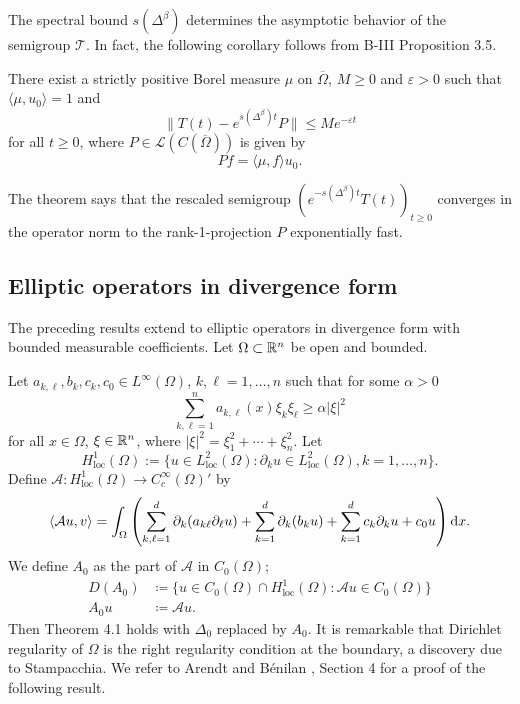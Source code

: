 The spectral bound $s(\Delta^\beta)$ determines the asymptotic behavior of the semigroup $\mathcal{T}$. 
In fact, the following corollary follows from B-III Proposition 3.5.
\begin{corollary} 
There exist a strictly positive Borel measure $\mu$ on $\overline{\Omega}$, $M \geq 0$ and $\varepsilon > 0$ such that $\langle \mu, u_0 \rangle = 1$ and
\[\|T(t) - e^{s(\Delta^\beta)t}P\| \leq Me^{-\varepsilon t}\]
for all $t \geq 0$, where $P \in \mathcal{L}(C(\overline{\Omega}))$ is given by
\[Pf = \langle \mu, f \rangle u_0.\]
\end{corollary}
The theorem says that the rescaled semigroup $(e^{-s(\Delta^\beta)t}T(t))_{t \geq 0}$ converges in the operator norm to the rank-1-projection $P$ exponentially fast.
\subsection{Elliptic operators in divergence form}
The preceding results extend to elliptic operators in divergence form with bounded measurable coefficients. Let $\Omega \subset \mathbb{R}^n$ be open and bounded.

Let $a_{k,\ell}, b_k, c_k, c_0 \in L^\infty(\Omega)$, $k, \ell = 1, \ldots, n$ such that for some $\alpha > 0$
\[
	\sum_{k,\ell=1}^n a_{k,\ell}(x)\xi_k\xi_\ell \geq \alpha|\xi|^2
\]
for all $x \in \Omega$, $\xi \in \mathbb{R}^n$, where $|\xi|^2 = \xi_1^2 + \cdots + \xi_n^2$.
Let 
%
\[
	H^1_{\text{loc}}(\Omega) := \{u \in L^2_{\text{loc}}(\Omega) \colon \partial_k u \in L^2_{\text{loc}}(\Omega), k = 1, \ldots, n\}.
\]
%
Define $\mathcal{A} \colon H^1_{\text{loc}}(\Omega) \to C_c^\infty(\Omega)'$ by
\[
	\langle \mathcal{A}u, v \rangle = \int_{\Omega}
		\left( \sum_{k,\ell=1}^d \partial_k(a_{k\ell}\partial_\ell u) + 
		\sum_{k=1}^d \partial_k(b_k u) + 
		\sum_{k=1}^d c_k \partial_k u + c_0 u \right) \mathop{}\!\mathrm{d}{x} .
\]
We define $A_0$ as the part of $\mathcal{A}$ in $C_0(\Omega)$; \ie
\begin{align*}
	D(A_0) &\coloneq \{u \in C_0(\Omega) \cap H^1_{\text{loc}}(\Omega) \colon \mathcal{A}u \in C_0(\Omega)\} \\
	A_0 u &\coloneq  \mathcal{A}u.
\end{align*}
Then Theorem 4.1 holds with $\Delta_0$ replaced by $A_0$. It is remarkable that Dirichlet regularity of $\Omega$ is the right regularity condition at the boundary, a discovery due to Stampacchia. We refer to Arendt and Bénilan \cite{ArBe99}, Section 4 for a proof of the following result.

